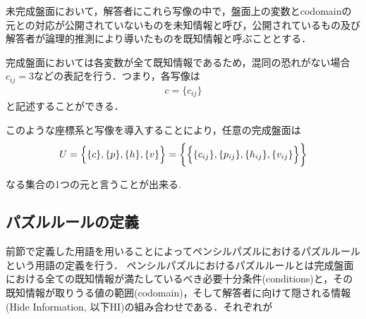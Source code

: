 未完成盤面において，解答者にこれら写像の中で，盤面上の変数とcodomainの元との対応が公開されていないものを未知情報と呼び，公開されているもの及び解答者が論理的推測により導いたものを既知情報と呼ぶこととする．

完成盤面においては各変数が全て既知情報であるため，混同の恐れがない場合$c_{ij}=3$などの表記を行う．つまり，各写像は
\begin{align*}
  c=\{c_{ij}\}
\end{align*}
と記述することができる．

このような座標系と写像を導入することにより，任意の完成盤面は
\begin{equation}
  U=\Bigl\{\{c\},\{p\},\{h\},\{v\}\Bigr\}=\biggl\{\Bigl\{\{c_{ij}\},\{p_{ij}\},\{h_{ij}\},\{v_{ij}\}\Bigr\}\biggr\}
\end{equation}


なる集合の1つの元と言うことが出来る.

\subsection{パズルルールの定義}
前節で定義した用語を用いることによってペンシルパズルにおけるパズルルールという用語の定義を行う．
ペンシルパズルにおけるパズルルールとは完成盤面における全ての既知情報が満たしているべき必要十分条件(conditions)と，その既知情報が取りうる値の範囲(codomain)，そして解答者に向けて隠される情報(Hide Information, 以下HI)の組み合わせである．それぞれが
